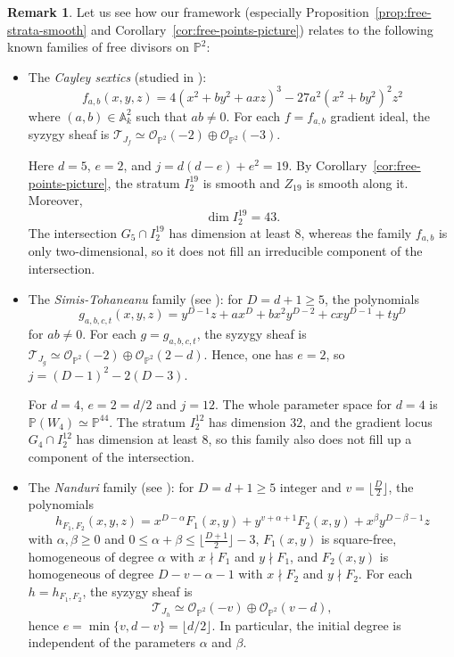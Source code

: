 \documentclass[11pt]{amsart} %
\theoremstyle{definition}
\newtheorem{Remark}[Theorem]{Remark}
\def\T{{\mathcal T}}
\begin{document}
\begin{Remark}\label{rmk:known-free-families-of-divisors}
Let us see how our framework (especially Proposition~\ref{prop:free-strata-smooth} and Corollary~\ref{cor:free-points-picture}) relates to the following known families of free divisors on $\mathbb{P}^2$:
\begin{itemize}
    \item[(a)] The \emph{Cayley sextics} (studied in \cite{simis2006depth}):
    $$
    f_{a,b}(x,y,z) = 4(x^2 + b y^2 + a xz)^3 - 27 a^2 (x^2 + b y^2)^2 z^2
    $$
    where $(a,b) \in \mathbb{A}^2_k$ such that $ab \neq 0$. For each $f = f_{a,b}$ gradient ideal, the syzygy sheaf is $\T_{J_f} \simeq \mathcal{O}_{\mathbb{P}^2}(-2) \oplus \mathcal{O}_{\mathbb{P}^2}(-3)$.

    Here $d=5$, $e=2$, and \(j=d(d-e)+e^2=19\). By Corollary~\ref{cor:free-points-picture}, the stratum $I_2^{19}$ is smooth and $Z_{19}$ is smooth along it. Moreover,
    \[
    \dim I_2^{19}=43.
    \]
    The intersection \(G_5\cap I_2^{19}\) has dimension at least $8$, whereas the family $f_{a,b}$ is only two-dimensional, so it does not fill an irreducible component of the intersection.
    
    \item[(b)] The \emph{Simis-Tohaneanu} family (see \cite[Proposition 2.2]{simis2014homology}): for $D = d+1 \geq 5$, the polynomials
    $$
    g_{a,b,c,t}(x,y,z) = y^{D-1}z + a x^D+ b x^2 y^{D-2} + c x y^{D-1} + t y^D
    $$
    for $a b \neq 0$. For each $g = g_{a,b,c,t}$, the syzygy sheaf is $\T_{J_g} \simeq \mathcal{O}_{\mathbb{P}^2}(-2) \oplus \mathcal{O}_{\mathbb{P}^2}(2-d)$. Hence, one has $e = 2$, so $j = (D-1)^2 - 2(D-3)$. 
    
    For $d = 4$, $e = 2 = d/2$ and $j = 12$. The whole parameter space for $d = 4$ is $\mathbb{P}(W_4) \simeq \mathbb{P}^{44}$. The stratum $I_2^{12}$ has dimension $32$, and the gradient locus $G_4 \cap I_2^{12}$ has dimension at least $8$, so this family also does not fill up a component of the intersection. 
    
    \item[(c)] The \emph{Nanduri} family (see \cite[Theorem 2.3]{nanduri2015family}): for $D = d+1 \geq 5$ integer and $v = \lfloor \frac{D}{2} \rfloor$, the polynomials 
    $$
    h_{F_1, F_2}(x,y,z) = x^{D-\alpha}F_1(x,y) + y^{v+\alpha+1} F_2(x,y) + x^\beta y^{D-\beta-1} z
    $$
    with $\alpha, \beta \geq 0$ and $0 \leq \alpha + \beta \leq \lfloor \frac{D+1}{2} \rfloor - 3$, $F_1(x,y)$ is square-free, homogeneous of degree $\alpha$ with $x \nmid F_1$ and $y \nmid F_1$, and $F_2(x,y)$ is homogeneous of degree $D-v-\alpha-1$ with $x \nmid F_2$ and $y \nmid F_2$. For each $h = h_{F_1, F_2}$, the syzygy sheaf is 
    $$
    \T_{J_h} \simeq \mathcal{O}_{\mathbb{P}^2}(-v)\oplus \mathcal{O}_{\mathbb{P}^2}(v-d),
    $$
    hence $e =  \min\{v, d-v\} = \lfloor d/2 \rfloor$. In particular, the initial degree is independent of the parameters
$\alpha$ and $\beta$.
\end{itemize}


\end{Remark}
\end{document}

